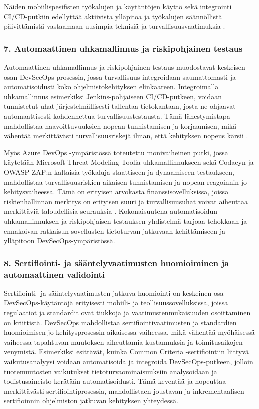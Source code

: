 \documentclass[bscthesis,finnish,oneside,biblatex]{uefcsthesis}
\begin{document}
Näiden mobiilispesifisten työkalujen ja käytäntöjen käyttö sekä integrointi CI/CD-putkiin edellyttää aktiivista ylläpitoa ja työkalujen säännöllistä päivittämistä vastaamaan uusimpia teknisiä ja turvallisuusvaatimuksia \cite{ozdenizci2024mobilizing}.

\subsubsection{7. Automaattinen uhkamallinnus ja riskipohjainen testaus}

Automaattinen uhkamallinnus ja riskipohjainen testaus muodostavat keskeisen osan DevSecOps-prosessia, jossa turvallisuus integroidaan saumattomasti ja automatisoidusti koko ohjelmistokehityksen elinkaareen. Integroimalla uhkamallinnus esimerkiksi Jenkins-pohjaiseen CI/CD-putkeen, voidaan tunnistetut uhat järjestelmällisesti tallentaa tietokantaan, josta ne ohjaavat automaattisesti kohdennettua turvallisuustestausta. Tämä lähestymistapa mahdollistaa haavoittuvuuksien nopean tunnistamisen ja korjaamisen, mikä vähentää merkittävästi turvallisuusriskejä ilman, että kehityksen nopeus kärsii \cite{nikolov2024_fit}.

Myös Azure DevOps -ympäristössä toteutettu monivaiheinen putki, jossa käytetään Microsoft Threat Modeling Toolia uhkamallinnukseen sekä Codacyn ja OWASP ZAP:n kaltaisia työkaluja staattiseen ja dynaamiseen testaukseen, mahdollistaa turvallisuusriskien aikaisen tunnistamisen ja nopean reagoinnin jo kehitysvaiheessa. Tämä on erityisen arvokasta finanssisovelluksissa, joissa riskienhallinnan merkitys on erityisen suuri ja turvallisuusuhat voivat aiheuttaa merkittäviä taloudellisia seurauksia \cite{kushwaha2024_cct}. Kokonaisuutena automatisoidun uhkamallinnuksen ja riskipohjaisen testauksen yhdistelmä tarjoaa tehokkaan ja ennakoivan ratkaisun sovellusten tietoturvan jatkuvaan kehittämiseen ja ylläpitoon DevSecOps-ympäristössä.

\subsubsection{8. Sertifiointi- ja sääntelyvaatimusten huomioiminen ja automaattinen validointi}

Sertifiointi- ja sääntelyvaatimusten jatkuva huomiointi on keskeinen osa DevSecOps-käytäntöjä erityisesti mobiili- ja teollisuussovelluksissa, joissa regulaatiot ja standardit ovat tiukkoja ja vaatimustenmukaisuuden osoittaminen on kriittistä. DevSecOps mahdollistaa sertifiointivaatimusten ja standardien huomioimisen jo kehitysprosessin aikaisessa vaiheessa, mikä vähentää myöhäisessä vaiheessa tapahtuvan muutoksen aiheuttamia kustannuksia ja toimitusaikojen venymistä. Esimerkiksi \cite{dupont2021_incremental} esittävät, kuinka Common Criteria -sertifiointiin liittyvä vaikutusanalyysi voidaan automatisoida ja integroida DevSecOps-putkeen, jolloin tuotemuutosten vaikutukset tietoturvaominaisuuksiin analysoidaan ja todistusaineisto kerätään automatisoidusti. Tämä keventää ja nopeuttaa merkittävästi sertifiointiprosessia, mahdollistaen joustavan ja inkrementaalisen sertifioinnin ohjelmiston jatkuvan kehityksen yhteydessä.
\end{document}
